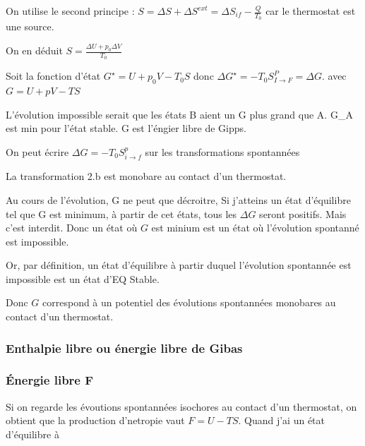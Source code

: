 \documentclass[french]{yLectureNote}
\begin{document}
On utilise le second principe : $S = \Delta S+ \Delta S^{ext}= \Delta S_{if} - \frac{Q}{T_0}$ car le thermostat est une source.

On en déduit $S = \frac{\Delta U + p_0 \Delta V}{T_0}$

Soit la fonction d'état $G^\star = U+p_0 V - T_0 S$ donc $\Delta G^\star = -T_0S_{I\to F}^P = \Delta G$. avec $G = U+pV-TS$

L'évolution impossible serait que les états B aient un G plus grand que A. G_A est min pour l'état stable. G est l'éngier libre de Gipps.


On peut écrire $\Delta G = -T_0 S^p_{i\to f}$ sur les transformations spontannées

La transformation 2.b est monobare au contact d'un thermostat.

Au cours de l'évolution, G ne peut que décroitre, Si j'atteins un état d'équilibre tel que G est minimum, à partir de cet états, tous les $\Delta G$ seront positifs. Mais c'est interdit. Donc un état où $G$ est minium est un état où l'évolution spontanné est impossible. 

Or, par définition, un état d'équilibre à partir duquel l'évolution spontannée est impossible est un état d'EQ Stable.

Donc $G$ correspond à un potentiel des évolutions spontannées monobares au contact d'un thermostat.


\subsubsection{Enthalpie libre ou énergie libre de Gibas}

\subsubsection{Énergie libre F}
Si on regarde les évoutions spontannées isochores au contact d'un thermostat, on obtient que la production d'netropie vaut $F = U-TS$. Quand j'ai un état d'équilibre à 
\end{document}
